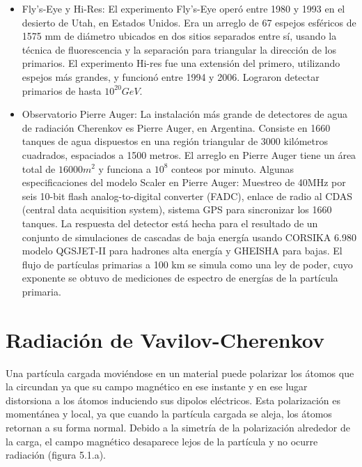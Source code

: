 \documentclass{book}
\begin{document}
\begin{itemize}
\item Fly's-Eye y Hi-Res: El experimento Fly's-Eye oper\'o entre 1980 y 1993 en el desierto de Utah, en Estados Unidos. Era un arreglo de 67 espejos esf\'ericos de 1575 mm de di\'ametro ubicados en dos sitios separados entre s\'i, usando la t\'ecnica de fluorescencia y la separaci\'on para triangular la direcci\'on de los primarios. El experimento Hi-res fue una extensi\'on del primero, utilizando espejos m\'as grandes, y funcion\'o entre 1994 y 2006. Lograron detectar primarios de hasta $10^{20} GeV$.
\item Observatorio Pierre Auger: La instalaci\'on m\'as grande de detectores de agua de radiaci\'on Cherenkov es Pierre Auger, en Argentina. Consiste en 1660 tanques de agua dispuestos en una regi\'on triangular de 3000 kil\'ometros cuadrados, espaciados a 1500 metros. El arreglo en Pierre Auger tiene un \'area total de $16000m^{2}$ y funciona a $10^8$ conteos por minuto. Algunas especificaciones del modelo Scaler en Pierre Auger: Muestreo de 40MHz por seis 10-bit flash analog-to-digital converter (FADC), enlace de radio al CDAS (central data acquisition system), sistema GPS para sincronizar los 1660 tanques. La respuesta del detector est\'a hecha para el resultado de un conjunto de simulaciones de cascadas de baja energ\'ia usando CORSIKA 6.980 modelo QGSJET-II para hadrones alta energ\'ia y GHEISHA para bajas. El flujo de part\'iculas primarias a 100 km se simula como una ley de poder, cuyo exponente se obtuvo de mediciones de espectro de energ\'ias de la part\'icula primaria. \citep{VILLASENOR}
\end{itemize}

\section{Radiaci\'on de Vavilov-Cherenkov}
Una part\'icula cargada movi\'endose en un material puede polarizar los \'atomos que la circundan ya que su campo magn\'etico en ese instante y en ese lugar distorsiona a los \'atomos induciendo sus dipolos el\'ectricos. Esta polarizaci\'on es moment\'anea y local, ya que cuando la part\'icula cargada se aleja, los \'atomos retornan a su forma normal. Debido a la simetr\'ia de la polarizaci\'on alrededor de la carga, el campo magn\'etico desaparece lejos de la part\'icula y no ocurre radiaci\'on (figura 5.1.a). \citep{PEREZ}
\end{document}

